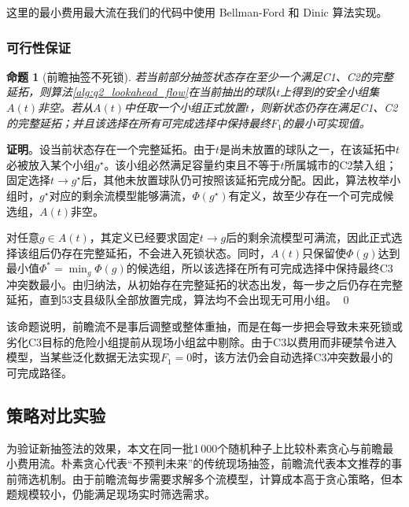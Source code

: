 \documentclass[12pt,a4paper]{article}
\newtheorem{proposition}[theorem]{命题}
\begin{document}
这里的最小费用最大流在我们的代码中使用 Bellman-Ford 和 Dinic 算法实现。

\subsubsection{可行性保证}

\begin{proposition}[前瞻抽签不死锁]
  若当前部分抽签状态存在至少一个满足C1、C2的完整延拓，则算法\ref{alg:q2_lookahead_flow}在当前抽出的球队$t$上得到的安全小组集$A(t)$非空。若从$A(t)$中任取一个小组正式放置$t$，则新状态仍存在满足C1、C2的完整延拓；并且该选择在所有可完成选择中保持最终$F_1$的最小可实现值。
\end{proposition}

\textbf{证明}。设当前状态存在一个完整延拓。由于$t$是尚未放置的球队之一，在该延拓中$t$必被放入某个小组$g^\star$。该小组必然满足容量约束且不等于$t$所属城市的C2禁入组；固定选择$t\to g^\star$后，其他未放置球队仍可按照该延拓完成分配。因此，算法枚举小组时，$g^\star$对应的剩余流模型能够满流，$\Phi(g^\star)$有定义，故至少存在一个可完成候选组，$A(t)$非空。

对任意$g\in A(t)$，其定义已经要求固定$t\to g$后的剩余流模型可满流，因此正式选择该组后仍存在完整延拓，不会进入死锁状态。同时，$A(t)$只保留使$\Phi(g)$达到最小值$\Phi^\ast=\min_g\Phi(g)$的候选组，所以该选择在所有可完成选择中保持最终C3冲突数最小。由归纳法，从初始存在完整延拓的状态出发，每一步之后仍存在完整延拓，直到53支县级队全部放置完成，算法均不会出现无可用小组。 \qed

该命题说明，前瞻流不是事后调整或整体重抽，而是在每一步把会导致未来死锁或劣化C3目标的危险小组提前从现场小组盆中剔除。由于C3以费用而非硬禁令进入模型，当某些泛化数据无法实现$F_1=0$时，该方法仍会自动选择C3冲突数最小的可完成路径。

\subsection{策略对比实验}

为验证新抽签法的效果，本文在同一批1\,000个随机种子上比较朴素贪心与前瞻最小费用流。朴素贪心代表“不预判未来”的传统现场抽签，前瞻流代表本文推荐的事前筛选机制。由于前瞻流每步需要求解多个流模型，计算成本高于贪心策略，但本题规模较小，仍能满足现场实时筛选需求。
\end{document}
